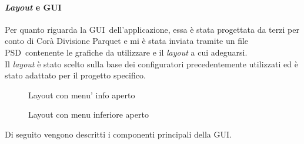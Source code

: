 \paragraph{\textit{Layout} e GUI\gloss}
Per quanto riguarda la GUI\gloss\ dell'applicazione, essa \`e stata progettata da terzi per conto di Cor\`a Divisione Parquet e mi \`e stata inviata tramite un file PSD\gloss\ contenente le grafiche da utilizzare e il \textit{layout} a cui adeguarsi.\\
Il \textit{layout} \`e stato scelto sulla base dei configuratori precedentemente utilizzati ed \`e stato adattato per il progetto specifico.

\begin{figure}[H]
	\centering
	\caption{Layout con menu' info aperto}
	\label{fig:Layout con menu info aperto}
\end{figure}

\begin{figure}[H]
	\centering
	\caption{Layout con menu inferiore aperto}
	\label{fig:Layout con menu inferiore aperto}
\end{figure}
\newpage
Di seguito vengono descritti i componenti principali della GUI\gloss .

